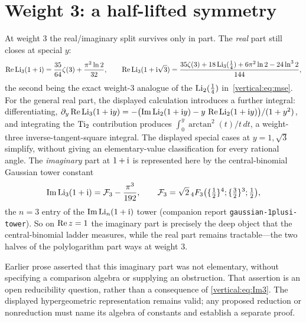 \section{Weight 3: a half-lifted symmetry}
At weight $3$ the real/imaginary split survives only in part. The \emph{real} part still closes at special
$y$:
\begin{equation}\label{vertical:eq:Re3}
  \operatorname{Re}\operatorname{Li}_3(1+\mathrm{i})=\frac{35}{64}\zeta(3)+\frac{\pi^2\ln2}{32},\qquad
  \operatorname{Re}\operatorname{Li}_3(1+\mathrm{i}\sqrt3)=\frac{35\zeta(3)+18\operatorname{Li}_3(\tfrac14)+6\pi^2\ln2-24\ln^3 2}{144},
\end{equation}
the second being the exact weight-3 analogue of the $\operatorname{Li}_2(\tfrac14)$ in~\eqref{vertical:eq:mse}. For the general
real part, the displayed calculation introduces a further integral: differentiating, $\partial_y\operatorname{Re}\operatorname{Li}_3(1+\mathrm{i} y)=-\bigl(\operatorname{Im}\operatorname{Li}_2(1+\mathrm{i} y)-y\,\operatorname{Re}\operatorname{Li}_2(1+\mathrm{i} y)\bigr)/(1+y^2)$,
and integrating the $\operatorname{Ti}_2$ contribution produces $\int_0^y\arctan^2(t)/t\,dt$, a weight-three inverse-tangent-square integral. The displayed special cases at $y=1,\sqrt3$ simplify, without giving an elementary-value classification for every rational angle. The \emph{imaginary} part at $1+\mathrm{i}$ is represented here by the
central-binomial Gaussian tower constant
\begin{equation}\label{vertical:eq:Im3}
  \operatorname{Im}\operatorname{Li}_3(1+\mathrm{i})=\mathcal F_3-\frac{\pi^3}{192},\qquad
  \mathcal F_3=\sqrt2\,{}_4F_3\bigl(\{\tfrac12\}^4;\{\tfrac32\}^3;\tfrac12\bigr),
\end{equation}
the $n=3$ entry of the $\operatorname{Im}\operatorname{Li}_n(1+\mathrm{i})$ tower (companion report
\texttt{gaussian-1plusi-tower}). So on $\operatorname{Re} z=1$ the imaginary part is precisely the deep object that
the central-binomial ladder measures, while the real part remains tractable---the two halves of the
polylogarithm part ways at weight $3$.
\begin{remark}\label{vertical:rem:nonreduction}
Earlier prose asserted that this imaginary part was not elementary, without
specifying a comparison algebra or supplying an obstruction. That assertion
is an open reducibility question, rather than a consequence of
\eqref{vertical:eq:Im3}. The displayed hypergeometric representation remains
valid; any proposed reduction or nonreduction must name its algebra of
constants and establish a separate proof.
\end{remark}
